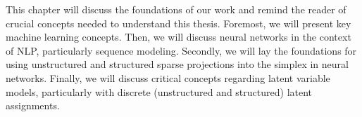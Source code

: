 \label{chap:background}

\cleardoublepage
\doublespacing

\noindent This chapter will discuss the foundations of our work and
remind the reader of crucial concepts needed to understand this
thesis. Foremost, we will present key machine learning concepts.
Then, we will discuss neural networks in the context of NLP,
particularly sequence modeling. Secondly, we will lay the foundations
for using unstructured and structured sparse projections into the
simplex in neural networks. Finally, we will discuss critical
concepts regarding latent variable models, particularly with discrete
(unstructured and structured) latent assignments.





\cleardoublepage
\singlespacing
